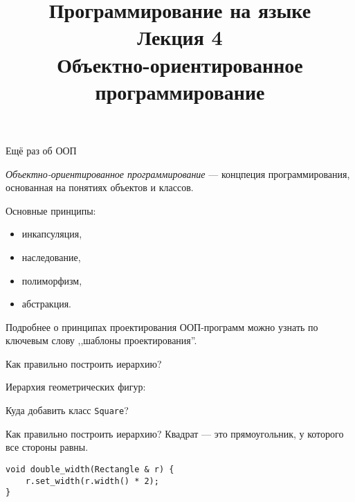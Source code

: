 \documentclass{beamer}
\title{{\bf Программирование на языке \langcpp\protect\\Лекция
4\protect\vspace{1em}\\}Объектно-ориентированное программирование}
\begin{document}
\begin{frame} 
  \titlepage
\end{frame}

\begin{frame}[fragile]{Ещё раз об ООП}

    {\em Объектно-ориентированное программирование} — 
    концпеция программирования, основанная на
    понятиях объектов и классов.

   \begin{block}{Основные принципы:}
   \begin{itemize}
       \item инкапсуляция,
       \item наследование,
       \item полиморфизм,
       \item абстракция.
   \end{itemize}
   \end{block}

   Подробнее о принципах проектирования ООП-программ
   можно узнать по ключевым слову ,,шаблоны проектирования''.
\end{frame}

\begin{frame}[fragile]{Как правильно построить иерархию?}

    Иерархия геометрических фигур:

\begin{center}
\end{center}
\vspace{2cm}

Куда добавить класс {\tt Square}?
\end{frame}

\begin{frame}[fragile]{Как правильно построить иерархию?}
    Квадрат — это прямоугольник, у которого все стороны равны.
\begin{center}
\end{center}
\vspace{-2mm}
\begin{lstlisting}
void double_width(Rectangle & r) {
    r.set_width(r.width() * 2);
}
\end{lstlisting}
\end{frame}
\end{document}
